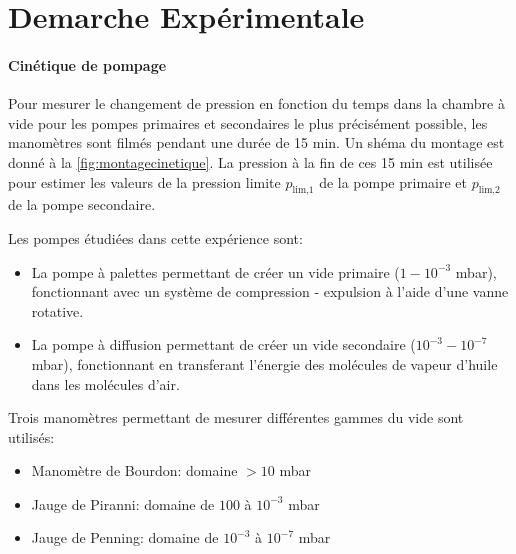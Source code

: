 \section{Demarche Expérimentale}

\paragraph*{Cinétique de pompage}
Pour mesurer le changement de pression en fonction du temps dans la chambre à vide pour les pompes primaires et secondaires le plus précisément possible, les manomètres sont filmés pendant une durée de 15 \unit{\minute}. Un shéma du montage est donné à la \autoref{fig:montagecinetique}. La pression à la fin de ces 15 \unit{\minute} est utilisée pour estimer les valeurs de la pression limite \(p_\textrm{lim,1}\) de la pompe primaire et \(p_\textrm{lim,2}\) de la pompe secondaire.

Les pompes étudiées dans cette expérience sont:

\begin{itemize}
    \item La pompe à palettes permettant de créer un vide primaire (\(1 - 10^{-3}\) \unit{\milli\bar}), fonctionnant avec un système de compression - expulsion à l'aide d'une vanne rotative.
    \item La pompe à diffusion permettant de créer un vide secondaire (\(10^{-3} - 10^{-7}\) \unit{\milli\bar}), fonctionnant en transferant l'énergie des molécules de vapeur d'huile dans les molécules d'air.
\end{itemize}

Trois manomètres permettant de mesurer différentes gammes du vide sont utilisés:

\begin{itemize}
    \item Manomètre de Bourdon: domaine \(> 10\) \unit{\milli\bar}
    \item Jauge de Piranni: domaine de \(100\) à \(10^{-3}\) \unit{\milli\bar}
    \item Jauge de Penning: domaine de \(10^{-3}\) à \(10^{-7}\) \unit{\milli\bar}
\end{itemize}

